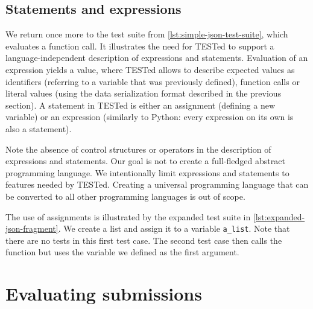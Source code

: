 \documentclass[../main]{subfiles}
\begin{document}

\subsection{Statements and expressions}\label{subsec:tested1-statements-and-expressions}

We return once more to the test suite from \vref{lst:simple-json-test-suite}, which evaluates a function call.
It illustrates the need for TESTed to support a language-independent description of expressions and statements.
Evaluation of an expression yields a value, where TESTed allows to describe expected values as identifiers (referring to a variable that was previously defined), function calls or literal values (using the data serialization format described in the previous section).
A statement in TESTed is either an assignment (defining a new variable) or an expression (similarly to Python: every expression on its own is also a statement).

Note the absence of control structures or operators in the description of expressions and statements.
Our goal is not to create a full-fledged abstract programming language.
We intentionally limit expressions and statements to features needed by TESTed.
Creating a universal programming language that can be converted to all other programming languages is out of scope.

The use of assignments is illustrated by the expanded test suite in \vref{lst:expanded-json-fragment}.
We create a list and assign it to a variable \texttt{a\_list}.
Note that there are no tests in this first test case.
The second test case then calls the function but uses the variable we defined as the first argument.

\section{Evaluating submissions}\label{sec:tested1-evaluating-submissions}
\end{document}
